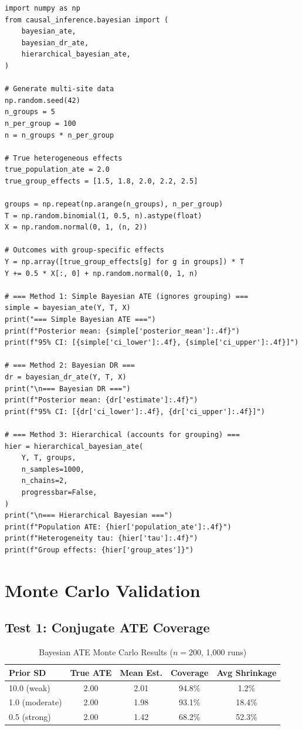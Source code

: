 \begin{verbatim}
import numpy as np
from causal_inference.bayesian import (
    bayesian_ate,
    bayesian_dr_ate,
    hierarchical_bayesian_ate,
)

# Generate multi-site data
np.random.seed(42)
n_groups = 5
n_per_group = 100
n = n_groups * n_per_group

# True heterogeneous effects
true_population_ate = 2.0
true_group_effects = [1.5, 1.8, 2.0, 2.2, 2.5]

groups = np.repeat(np.arange(n_groups), n_per_group)
T = np.random.binomial(1, 0.5, n).astype(float)
X = np.random.normal(0, 1, (n, 2))

# Outcomes with group-specific effects
Y = np.array([true_group_effects[g] for g in groups]) * T
Y += 0.5 * X[:, 0] + np.random.normal(0, 1, n)

# === Method 1: Simple Bayesian ATE (ignores grouping) ===
simple = bayesian_ate(Y, T, X)
print("=== Simple Bayesian ATE ===")
print(f"Posterior mean: {simple['posterior_mean']:.4f}")
print(f"95% CI: [{simple['ci_lower']:.4f}, {simple['ci_upper']:.4f}]")

# === Method 2: Bayesian DR ===
dr = bayesian_dr_ate(Y, T, X)
print("\n=== Bayesian DR ===")
print(f"Posterior mean: {dr['estimate']:.4f}")
print(f"95% CI: [{dr['ci_lower']:.4f}, {dr['ci_upper']:.4f}]")

# === Method 3: Hierarchical (accounts for grouping) ===
hier = hierarchical_bayesian_ate(
    Y, T, groups,
    n_samples=1000,
    n_chains=2,
    progressbar=False,
)
print("\n=== Hierarchical Bayesian ===")
print(f"Population ATE: {hier['population_ate']:.4f}")
print(f"Heterogeneity tau: {hier['tau']:.4f}")
print(f"Group effects: {hier['group_ates']}")
\end{verbatim}


\section{Monte Carlo Validation}

\subsection{Test 1: Conjugate ATE Coverage}

\begin{table}[h]
\centering
\caption{Bayesian ATE Monte Carlo Results ($n=200$, 1,000 runs)}
\begin{tabular}{lcccc}
\toprule
Prior SD & True ATE & Mean Est. & Coverage & Avg Shrinkage \\
\midrule
10.0 (weak) & 2.00 & 2.01 & 94.8\% & 1.2\% \\
1.0 (moderate) & 2.00 & 1.98 & 93.1\% & 18.4\% \\
0.5 (strong) & 2.00 & 1.42 & 68.2\% & 52.3\% \\
\bottomrule
\end{tabular}
\end{table}

